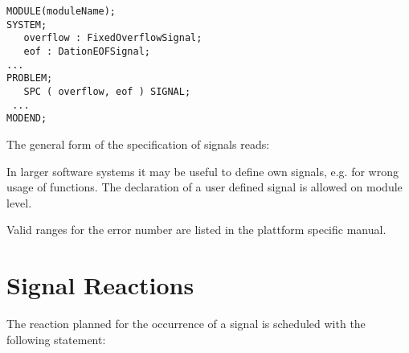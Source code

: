\begin{lstlisting}
MODULE(moduleName);
SYSTEM;
   overflow : FixedOverflowSignal;
   eof : DationEOFSignal;
...
PROBLEM;
   SPC ( overflow, eof ) SIGNAL;
 ... 
MODEND;
\end{lstlisting}

The general form of the specification of signals reads:

\begin{grammarframe}

\end{grammarframe}


In larger software systems it may be useful to define own signals, e.g.
for wrong usage of functions. 
The declaration of a user defined signal is allowed on module level.

\begin{grammarframe}

\end{grammarframe}

Valid ranges for the error number are listed in the plattform specific manual.


\section{Signal Reactions}
\label{sec_signal_reactions}
The reaction planned for the occurrence of a signal is scheduled with
the following statement:


